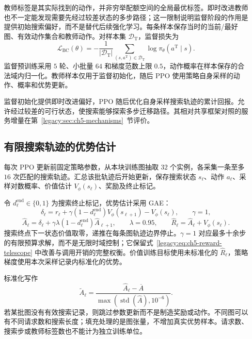 教师标签是其实际找到的动作，并非穷举配额空间的全局最优标签。即时改进教师也不一定能发现需要先经过较差状态的多步路径；这一限制说明监督阶段的作用是提供初始搜索偏好，而不是替代后续强化学习。每条样本保存当时的当前/最好图、有效动作集合和教师动作。对样本集 $\mathcal D_{\mathrm T}$，监督损失为
\begin{equation}
 \mathcal L_{\mathrm{BC}}(\theta)=
 -\frac{1}{|\mathcal D_{\mathrm T}|}
 \sum_{(s,a^{\mathrm T})\in\mathcal D_{\mathrm T}}
 \log\pi_\theta(a^{\mathrm T}\mid s).
 \label{legacy:eq:ch5-bc-loss}
\end{equation}
监督预训练采用 $5$ 轮、小批量 $64$ 和梯度范数上限 $0.5$，动作概率在样本保存的合法域内归一化。教师样本仅用于监督初始化，随后 PPO 使用策略自身采样的动作、概率和优势更新。

监督初始化提供即时改进偏好，PPO 随后优化自身采样搜索轨迹的累计回报。允许经过较差的可行状态，使搜索能够探索多步迁移路径。其相对共享框架对照的服务增量在第~\ref{legacy:sec:ch5-mechanisms}~节评价。

\subsection{有限搜索轨迹的优势估计}

每次 PPO 更新前固定策略参数，从本块训练图抽取 $32$ 个实例，各采集一条至多 $16$ 次匹配的搜索轨迹。汇总该批轨迹后开始更新，保存搜索状态 $s_\ell$、动作 $a_\ell$、采样对数概率、价值估计 $V_\phi(s_\ell)$、奖励及终止标记。

令 $d_\ell^{\mathrm{end}}\in\{0,1\}$ 为搜索终止标记，优势估计采用 GAE\cite{schulman2015high}：
\begin{equation}
 \delta_\ell=r_\ell+\gamma(1-d_\ell^{\mathrm{end}})V_\phi(s_{\ell+1})-V_\phi(s_\ell),
 \qquad \gamma=1,
 \label{legacy:eq:ch5-search-td}
\end{equation}
\begin{equation}
 \widehat A_\ell=\delta_\ell+\gamma\lambda(1-d_\ell^{\mathrm{end}})\widehat A_{\ell+1},
 \qquad\lambda=0.95,\qquad
 \widehat R_\ell=\widehat A_\ell+V_\phi(s_\ell).
 \label{legacy:eq:ch5-search-gae}
\end{equation}
搜索终点下一状态价值取零，递推在每条图轨迹边界停止。$\gamma=1$ 对应最多十余步的有限预算求解，而不是无限时域控制；它保留式~\eqref{legacy:eq:ch5-reward-telescope} 中改善与调用开销的完整权衡。价值训练目标使用未标准化的 $\widehat R_\ell$，策略梯度使用本次采样记录内标准化的优势。

标准化写作
\begin{equation}
 \widetilde A_\ell=\frac{\widehat A_\ell-\overline A}
 {\max(\operatorname{std}(\widehat A),10^{-6})}.
 \label{legacy:eq:ch5-adv-normalization}
\end{equation}
若某批图没有有效搜索记录，则跳过参数更新而不是制造奖励或动作。不同图可以有不同请求数和搜索长度；填充处理的是图张量，不增加真实优势样本。请求数、搜索步或教师标签数也不能计为独立训练单位。

